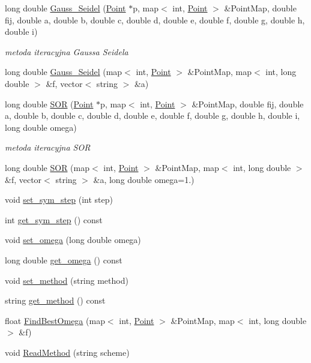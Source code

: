 \begin{DoxyCompactItemize}
\item 
long double \hyperlink{class_s_scheme_a0dd0343c9bcb4b35849403d8a76f9d18}{Gauss\+\_\+\+Seidel} (\hyperlink{class_point}{Point} $\ast$p, map$<$ int, \hyperlink{class_point}{Point} $>$ \&Point\+Map, double fij, double a, double b, double c, double d, double e, double f, double g, double h, double i)
\begin{DoxyCompactList}\small\item\em metoda iteracyjna Gaussa Seidela \end{DoxyCompactList}\item 
long double \hyperlink{class_s_scheme_a48ee384f6206a5c55931a8e3361f7d57}{Gauss\+\_\+\+Seidel} (map$<$ int, \hyperlink{class_point}{Point} $>$ \&Point\+Map, map$<$ int, long double $>$ \&f, vector$<$ string $>$ \&a)
\item 
long double \hyperlink{class_s_scheme_a48fa493450e8c55967bdaa78e9e1bd7c}{S\+O\+R} (\hyperlink{class_point}{Point} $\ast$p, map$<$ int, \hyperlink{class_point}{Point} $>$ \&Point\+Map, double fij, double a, double b, double c, double d, double e, double f, double g, double h, double i, long double omega)
\begin{DoxyCompactList}\small\item\em metoda iteracyjna S\+O\+R \end{DoxyCompactList}\item 
long double \hyperlink{class_s_scheme_a4bf15feac00aed3dd724fbf4921a4144}{S\+O\+R} (map$<$ int, \hyperlink{class_point}{Point} $>$ \&Point\+Map, map$<$ int, long double $>$ \&f, vector$<$ string $>$ \&a, long double omega=1.)
\item 
void \hyperlink{class_s_scheme_a2032e9d35d0931c17d8f96170d5d843a}{set\+\_\+sym\+\_\+step} (int step)
\item 
int \hyperlink{class_s_scheme_acadf8feab53234c5923990af908c2733}{get\+\_\+sym\+\_\+step} () const 
\item 
void \hyperlink{class_s_scheme_a99fefa3de0fa0859be662faa9e21a01b}{set\+\_\+omega} (long double omega)
\item 
long double \hyperlink{class_s_scheme_a69a8b9ea4d5c04b5def66db3d64c4c22}{get\+\_\+omega} () const 
\item 
void \hyperlink{class_s_scheme_a3749de0c92f9a4a50c10ded4d7713344}{set\+\_\+method} (string method)
\item 
string \hyperlink{class_s_scheme_a8c73b695beb2beb76079444aa92f7922}{get\+\_\+method} () const 
\item 
float \hyperlink{class_s_scheme_ab5e7404ff79c4c13d12f64e69b284027}{Find\+Best\+Omega} (map$<$ int, \hyperlink{class_point}{Point} $>$ \&Point\+Map, map$<$ int, long double $>$ \&f)
\item 
void \hyperlink{class_s_scheme_a04180646227c260880ddc35ee0b563e7}{Read\+Method} (string scheme)
\end{DoxyCompactItemize}
